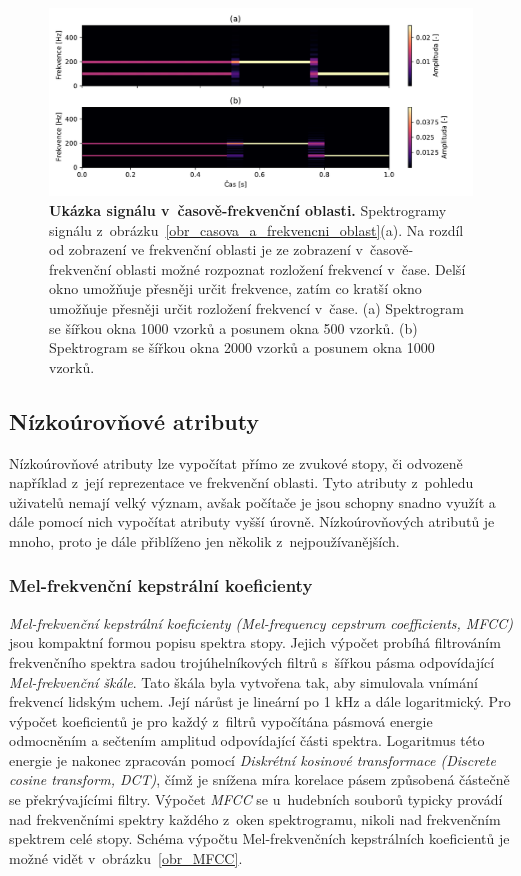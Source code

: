 \begin{figure}[h]
    \centering
    \includegraphics[width=\textwidth]{obrazky/spektrogramy.pdf}
    \caption{\textbf{Ukázka signálu v~časově-frekvenční oblasti.} Spektrogramy signálu z~obrázku~\ref{obr_casova_a_frekvencni_oblast}(a). Na rozdíl od zobrazení ve frekvenční oblasti je ze zobrazení v~časově-frekvenční oblasti možné rozpoznat rozložení frekvencí v~čase. Delší okno umožňuje přesněji určit frekvence, zatím co kratší okno umožňuje přesněji určit rozložení frekvencí v~čase. (a) Spektrogram se šířkou okna 1000 vzorků a posunem okna 500 vzorků. (b) Spektrogram se šířkou okna 2000 vzorků a posunem okna 1000 vzorků.}
    \label{obr_spektrogramy}
\end{figure}

\clearpage

\subsection*{Nízkoúrovňové atributy}
\label{nizkourovnove_atributy}
Nízkoúrovňové atributy lze vypočítat přímo ze zvukové stopy, či odvozeně například z~její reprezentace ve frekvenční oblasti. Tyto atributy z~pohledu uživatelů nemají velký význam, avšak počítače je jsou schopny snadno využít a dále pomocí nich vypočítat atributy vyšší úrovně. Nízkoúrovňových atributů je mnoho, proto je dále přiblíženo jen několik z~nejpoužívanějších.\cite{MIR}

\subsubsection*{Mel-frekvenční kepstrální koeficienty}
\textit{Mel-frekvenční kepstrální koeficienty (Mel-frequency cepstrum coefficients, MFCC)} jsou kompaktní formou popisu spektra stopy. Jejich výpočet probíhá filtrováním frekvenčního spektra sadou trojúhelníkových filtrů s~šířkou pásma odpovídající \textit{Mel-frekvenční škále}. Tato škála byla vytvořena tak, aby simulovala vnímání frekvencí lidským uchem. Její nárůst je lineární po 1 kHz a dále logaritmický. Pro výpočet koeficientů je pro každý z~filtrů vypočítána pásmová energie odmocněním a sečtením amplitud odpovídající části spektra. Logaritmus této energie je nakonec zpracován pomocí \textit{Diskrétní kosinové transformace (Discrete cosine transform, DCT)}, čímž je snížena míra korelace pásem způsobená částečně se překrývajícími filtry. Výpočet \textit{MFCC} se u~hudebních souborů typicky provádí nad frekvenčními spektry každého z~oken spektrogramu, nikoli nad frekvenčním spektrem celé stopy. Schéma výpočtu Mel-frekvenčních kepstrálních koeficientů je možné vidět v~obrázku~\ref{obr_MFCC}.\cite{MIR}\cite{low_level}\cite{aca}

